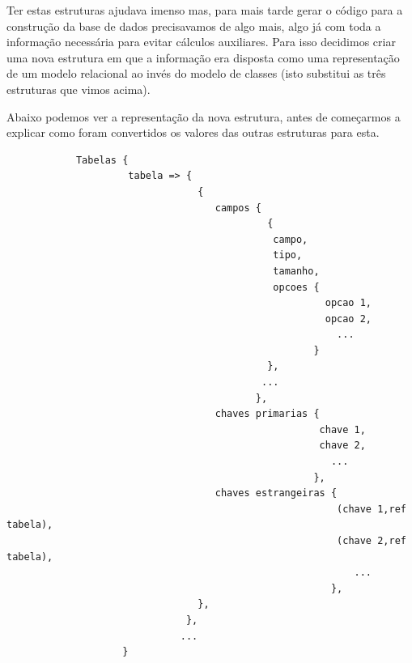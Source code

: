 \documentclass[a4paper]{article}
\begin{document}
\hspace{1cm}Ter estas estruturas ajudava imenso mas, para mais tarde gerar o código para a construção da base de dados precisavamos de algo mais, algo já com toda a informação necessária para evitar cálculos auxiliares. Para isso decidimos criar uma nova estrutura em que a informação era disposta como uma representação de um modelo relacional ao invés do modelo de classes (isto substitui as três estruturas que vimos acima).

\hspace{1cm}Abaixo podemos ver a representação da nova estrutura, antes de começarmos a explicar como foram convertidos os valores das outras estruturas para esta.\\

\begin{small}
\begin{lstlisting}
            Tabelas {
                     tabela => {
                                 {
                                    campos {
                                             {
                                              campo,
                                              tipo,
                                              tamanho,
                                              opcoes {
                                                       opcao 1,
                                                       opcao 2,
                                                         ...
                                                     }
                                             },
                                            ...
                                           },
                                    chaves primarias {
                                                      chave 1,
                                                      chave 2,
                                                        ...
                                                     },
                                    chaves estrangeiras {
                                                         (chave 1,ref tabela),
                                                         (chave 2,ref tabela),
                                                            ...
                                                        },
                                 },
                               },
                              ...
                    }
\end{lstlisting}
\end{small}
\end{document}
